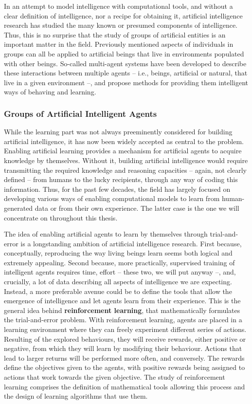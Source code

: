 In an attempt to model intelligence with computational tools, and without a clear definition of intelligence, nor a recipe for obtaining it, artificial intelligence research has studied the many known or presumed components of intelligence. Thus, this is no surprise that the study of groups of artificial entities is an important matter in the field. Previously mentioned aspects of individuals in groups can all be applied to artificial beings that live in environments populated with other beings. 
So-called multi-agent systems have been developed to describe these interactions between multiple agents -- i.e., beings, artificial or natural, that live in a given environment --, and propose methods for providing them intelligent ways of behaving and learning. 
% 

\subsubsection{Groups of Artificial Intelligent Agents}

While the learning part was not always preeminently considered for building artificial intelligence, it has now been widely accepted as central to the problem. Enabling artificial learning provides a mechanism for artificial agents to acquire knowledge by themselves. Without it, building artificial intelligence would require transmitting the required knowledge and reasoning capacities -- again, not clearly defined -- from humans to the lucky recipients, through any way of coding this information. Thus, for the past few decades, the field has largely focused on developing various ways of enabling computational models to learn from human-generated data or from their own experience. The latter case is the one we will concentrate on throughout this thesis. 

The idea of enabling artificial agents to learn by themselves through trial-and-error is a longstanding ambition of artificial intelligence research. First because, conceptually, reproducing the way living beings learn seems both logical and extremely appealing. Second because, more practically, supervised training of intelligent agents requires time, effort -- these two, we will put anyway --, and, crucially, a lot of data describing all aspects of intelligence we are expecting. Instead, a more preferable avenue could be to define the tools that allow the emergence of intelligence and let agents learn from their experience. This is the general idea behind \textbf{reinforcement learning}, that mathematically formulates the trial-and-error problem. With reinforcement learning, agents are placed in a learning environment where they can freely experiment different series of actions. Resulting of the explored behaviours, they will receive rewards, either positive or negative, from which they will learn by modifying their behaviour. Actions that lead to larger returns will be performed more often, and conversely. The rewards define the objectives given to the agents, with positive rewards being assigned to actions that work towards the given objective. The study of reinforcement learning comprises the definition of mathematical tools allowing this process and the design of learning algorithms that use them. 

